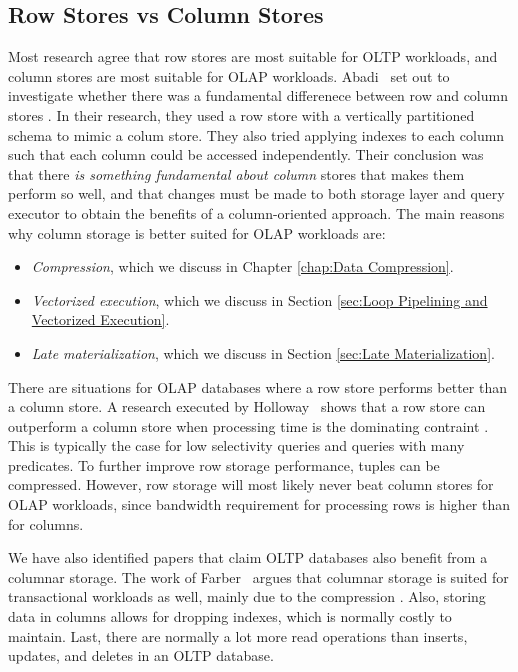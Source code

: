 \subsection{Row Stores vs Column Stores}
\label{sub:Row Stores vs Column Stores}
Most research agree that row stores are most suitable for OLTP workloads, and column stores are most suitable for OLAP workloads. Abadi \ea~set out to investigate whether there was a fundamental differenece between row and column stores \cite{Abadi2008-dd}. In their research, they used a row store with a vertically partitioned schema to mimic a colum store. They also tried applying indexes to each column such that each column could be accessed independently. Their conclusion was that there \textit{is something fundamental about column} stores that makes them perform so well, and that changes must be made to both storage layer and query executor to obtain the benefits of a column-oriented approach. The main reasons why column storage is better suited for OLAP workloads are:
\begin{itemize}
  \item \textit{Compression}, which we discuss in Chapter \ref{chap:Data Compression}.
  \item \textit{Vectorized execution}, which we discuss in Section \ref{sec:Loop Pipelining and Vectorized Execution}.
  \item \textit{Late materialization}, which we discuss in Section \ref{sec:Late Materialization}.
\end{itemize}

There are situations for OLAP databases where a row store performs better than a column store. A research executed by Holloway \ea~shows that a row store can outperform a column store when processing time is the dominating contraint \cite{Holloway2008-rr}. This is typically the case for low selectivity queries and queries with many predicates. To further improve row storage performance, tuples can be compressed. However, row storage will most likely never beat column stores for OLAP workloads, since bandwidth requirement for processing rows is higher than for columns.


We have also identified papers that claim OLTP databases also benefit from a columnar storage. The work of Farber \ea~argues that columnar storage is suited for transactional workloads as well, mainly due to the compression \cite{Farber2012-vh}. Also, storing data in columns allows for dropping indexes, which is normally costly to maintain. Last, there are normally a lot more read operations than inserts, updates, and deletes in an OLTP database.

